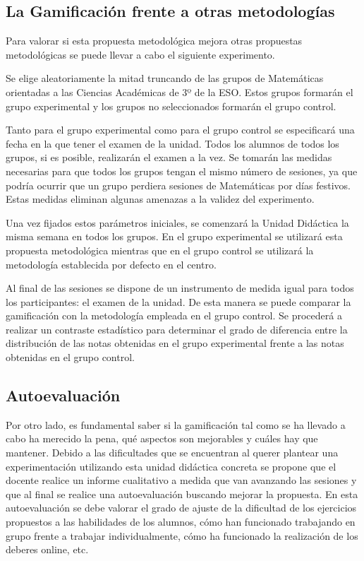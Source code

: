 \label{evalGami}

\subsection{La Gamificación frente a otras metodologías}

Para valorar si esta propuesta metodológica mejora otras propuestas metodológicas se puede llevar a cabo el siguiente experimento.

Se elige aleatoriamente la mitad truncando de las grupos de Matemáticas orientadas a las Ciencias Académicas de 3º de la ESO.
%
Estos grupos formarán el grupo experimental y los grupos no seleccionados formarán el grupo control.

Tanto para el grupo experimental como para el grupo control se especificará una fecha en la que tener el examen de la unidad.
%
Todos los alumnos de todos los grupos, si es posible, realizarán el examen a la vez.
%
Se tomarán las medidas necesarias para que todos los grupos tengan el mismo número de sesiones, ya que podría ocurrir que un grupo perdiera sesiones de Matemáticas por días festivos.
%
Estas medidas eliminan algunas amenazas a la validez del experimento.

Una vez fijados estos parámetros iniciales, se comenzará la Unidad Didáctica la misma semana en todos los grupos.
%
En el grupo experimental se utilizará esta propuesta metodológica mientras que en el grupo control se utilizará la metodología establecida por defecto en el centro.

Al final de las sesiones se dispone de un instrumento de medida igual para todos los participantes: el examen de la unidad.
%
De esta manera se puede comparar la gamificación con la metodología empleada en el grupo control.
%
Se procederá a realizar un contraste estadístico para determinar el grado de diferencia entre la distribución de las notas obtenidas en el grupo experimental frente a las notas obtenidas en el grupo control.


\subsection{Autoevaluación}

Por otro lado, es fundamental saber si la gamificación tal como se ha llevado a cabo ha merecido la pena, qué aspectos son mejorables y cuáles hay que mantener.
%
Debido a las dificultades que se encuentran al querer plantear una experimentación utilizando esta unidad didáctica concreta se propone que el docente realice un informe cualitativo a medida que van avanzando las sesiones y que al final se realice una autoevaluación buscando mejorar la propuesta.
%
En esta autoevaluación se debe valorar el grado de ajuste de la dificultad de los ejercicios propuestos a las habilidades de los alumnos, 
%
cómo han funcionado trabajando en grupo frente a trabajar individualmente, cómo ha funcionado la realización de los deberes online, etc.

